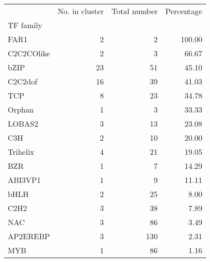 \begin{tabular}{lrrr}
\toprule
{} &  No. in cluster &  Total number &  Percentage \\
TF family  &                 &               &             \\
\midrule
FAR1       &               2 &             2 &      100.00 \\
C2C2COlike &               2 &             3 &       66.67 \\
bZIP       &              23 &            51 &       45.10 \\
C2C2dof    &              16 &            39 &       41.03 \\
TCP        &               8 &            23 &       34.78 \\
Orphan     &               1 &             3 &       33.33 \\
LOBAS2     &               3 &            13 &       23.08 \\
C3H        &               2 &            10 &       20.00 \\
Trihelix   &               4 &            21 &       19.05 \\
BZR        &               1 &             7 &       14.29 \\
ABI3VP1    &               1 &             9 &       11.11 \\
bHLH       &               2 &            25 &        8.00 \\
C2H2       &               3 &            38 &        7.89 \\
NAC        &               3 &            86 &        3.49 \\
AP2EREBP   &               3 &           130 &        2.31 \\
MYB        &               1 &            86 &        1.16 \\
\bottomrule
\end{tabular}
